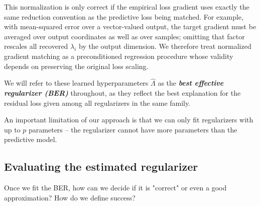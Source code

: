\documentclass[10pt]{article}
\begin{document}
This normalization is only correct if the empirical loss gradient uses exactly the same reduction convention as the predictive loss being matched. For example, with mean-squared error over a vector-valued output, the target gradient must be averaged over output coordinates as well as over samples; omitting that factor rescales all recovered \(\lambda_i\) by the output dimension. We therefore treat normalized gradient matching as a preconditioned regression procedure whose validity depends on preserving the original loss scaling.

We will refer to these learned hyperparameters $\hat{\Lambda}$ as the \emph{\textbf{best effective regularizer (BER)}} throughout, as they reflect the best explanation for the residual loss given among all regularizers in the same family. 

An important limitation of our approach is that we can only fit regularizers with up to $p$ parameters -- the regularizer cannot have more parameters than the predictive model. 






\subsection{Evaluating the estimated regularizer}
Once we fit the BER, how can we decide if it is "correct" or even a good approximation? How do we define success?
\end{document}
